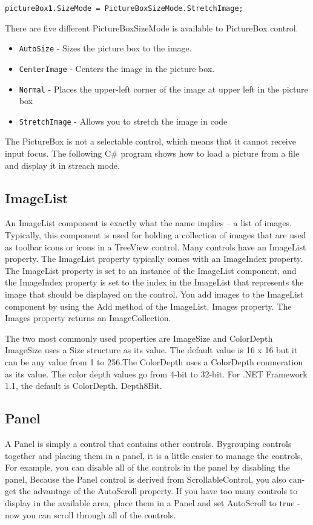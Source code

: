 \begin{lstlisting}[numbers=none]
pictureBox1.SizeMode = PictureBoxSizeMode.StretchImage;
\end{lstlisting}

There are five different PictureBoxSizeMode is available to PictureBox control.

\begin{itemize}
	\item \verb*|AutoSize| - Sizes the picture box to the image.
	\item \verb*|CenterImage| - Centers the image in the picture box.
	\item \verb*|Normal| - Places the upper-left corner of the image at upper left in the picture box
	\item \verb*|StretchImage| - Allows you to stretch the image in code
\end{itemize}


The PictureBox is not a selectable control, which means that it cannot receive input focus. The following C\# program shows how to load a picture from a file and display it in streach mode.

\subsection{ImageList}
An ImageList component is exactly what the name implies – a list of images. Typically, this component is used for holding a collection of images that are used as toolbar icons or icons in a TreeView control. Many controls have an ImageList property. The ImageList property typically comes with an ImageIndex property. The ImageList property is set to an instance of the ImageList component, and the ImageIndex property is set to the index in the ImageList that represents the image that should be displayed on the control. You add images to the ImageList component by using the Add method of the ImageList. Images property. The Images property returns an ImageCollection.

The two most commonly used properties are ImageSize and ColorDepth ImageSize uses a Size structure as its value. The default value is 16 x 16 but it can be any value from 1 to 256.The ColorDepth uses a ColorDepth enumeration as its value. The color depth values go from 4-bit to 32-bit. For .NET Framework 1.1, the default is ColorDepth. Depth8Bit.

\subsection{Panel}
A Panel is simply a control that contains other controls. Bygrouping controls together and placing them in a panel, it is a little easier to manage the controls, For example, you can disable all of the controls in the panel by disabling the panel, Because the Panel control is derived from ScrollableControl, you also can-get the advantage of the AutoScroll property. If you have too many controls to display in the available area, place them in a Panel and set AutoScroll to true - now you can scroll through all of the controls.

